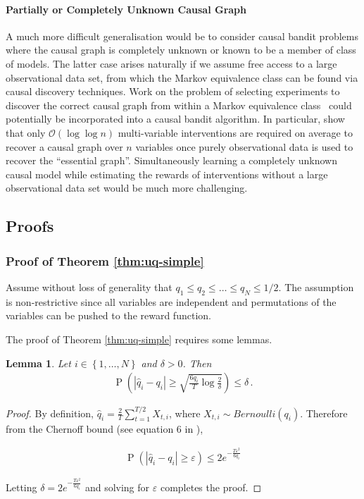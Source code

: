 \documentclass[11pt,a4paper,oneside]{book}
\newcommand{\set}[1]{\left\{#1\right\}}
\newcommand{\eq}[1]{\begin{align*}#1\end{align*}}
\newcommand{\bigo}[1]{\mathcal{O}\left( #1 \right)}
\renewcommand{\P}[1]{\operatorname{P}\left(#1\right)}
\theoremstyle{plain}
\newtheorem{lemma}[theorem]{Lemma}
\theoremstyle{definition}
\let\epsilon\varepsilon
\begin{document}
\paragraph{Partially or Completely Unknown Causal Graph}
A much more difficult generalisation would be to consider causal bandit problems where the causal graph is completely unknown or known to be a member of class of models.
The latter case arises naturally if we assume free access to a large observational data set, from which the Markov equivalence class can be found via causal discovery techniques. 
Work on the problem of selecting experiments to discover the correct causal graph from within a Markov equivalence class~\citep{eberhardt2005,eberhardt2010causal,hauser2014two,Hu2014} could potentially be incorporated into a causal bandit algorithm.
In particular, \citet{Hu2014} show that only $\bigo{\log \log n}$ multi-variable interventions are required on average to recover a causal graph over $n$ variables once purely observational data is used to recover the ``essential graph''.
Simultaneously learning a completely unknown causal model while estimating the rewards of interventions without a large observational data set would be much more challenging.

\subsection{Proofs}
\subsubsection{Proof of Theorem \ref{thm:uq-simple}}\label{sec:thm:uq-simple}


Assume without loss of generality that $q_1 \leq q_2 \leq \ldots \leq q_N \leq 1/2$. The assumption is non-restrictive since all variables
are independent and permutations of the variables can be pushed to the reward function. 

The proof of Theorem \ref{thm:uq-simple} requires some lemmas. \

\begin{lemma}\label{lem:conc1}
Let $i \in \set{1,\ldots, N}$ and $\delta > 0$. Then
\eq{
\P{\left|\hat q_i - q_i\right| \geq \sqrt{\frac{6q_i}{T} \log \frac{2}{\delta}}} \leq \delta\,.
}
\end{lemma}

\begin{proof}
By definition, $\hat{q}_i = \frac{2}{T}\sum_{t=1}^{T/2}X_{t,i}$, where $X_{t,i} \sim Bernoulli(q_i)$. Therefore from the Chernoff bound (see equation 6 in \citet{Hagerup1990}),

\eq{
\P{\left|\hat q_i - q_i\right| \geq \epsilon} \leq 2e^{-\frac{T\epsilon^2}{6q_i}}
}

Letting $\delta = 2e^{-\frac{T\epsilon^2}{6q_i}}$ and solving for $\epsilon$ completes the proof.

\end{proof}
\end{document}
